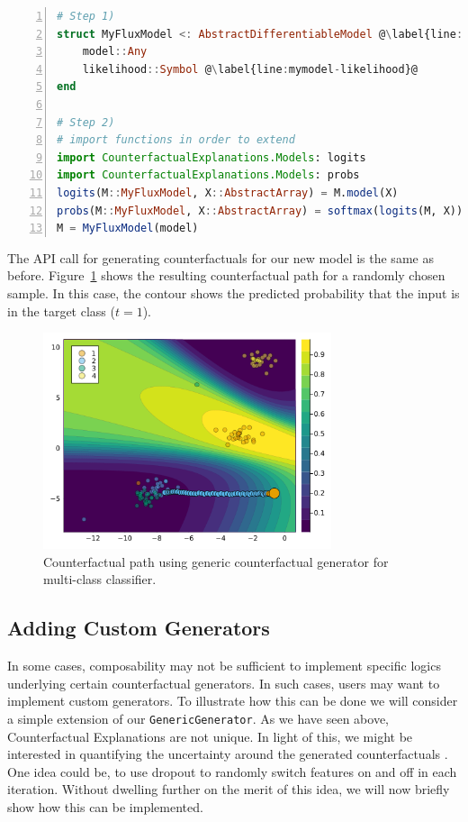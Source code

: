 \documentclass[
  letterpaper,
  DIV=11,
  numbers=noendperiod]{scrartcl}
\begin{document}
\begin{lstlisting}[language=Julia, escapechar=@, numbers=left, label={lst:mymodel}, caption={A wrapper for Flux models.}]
# Step 1)
struct MyFluxModel <: AbstractDifferentiableModel @\label{line:mymodel-subtype}@
    model::Any
    likelihood::Symbol @\label{line:mymodel-likelihood}@
end

# Step 2)
# import functions in order to extend
import CounterfactualExplanations.Models: logits
import CounterfactualExplanations.Models: probs 
logits(M::MyFluxModel, X::AbstractArray) = M.model(X)
probs(M::MyFluxModel, X::AbstractArray) = softmax(logits(M, X))
M = MyFluxModel(model)
\end{lstlisting}

The API call for generating counterfactuals for our new model is the
same as before. Figure~\ref{fig-multi} shows the resulting
counterfactual path for a randomly chosen sample. In this case, the
contour shows the predicted probability that the input is in the target
class (\(t=1\)).

\begin{figure}

{\centering \includegraphics[width=3.33333in,height=2.5in]{www/ce_multi.png}

}

\caption{\label{fig-multi}Counterfactual path using generic
counterfactual generator for multi-class classifier.}

\end{figure}

\hypertarget{sec-custom-gen}{%
\subsection{Adding Custom Generators}\label{sec-custom-gen}}

In some cases, composability may not be sufficient to implement specific
logics underlying certain counterfactual generators. In such cases,
users may want to implement custom generators. To illustrate how this
can be done we will consider a simple extension of our
\texttt{GenericGenerator}. As we have seen above, Counterfactual
Explanations are not unique. In light of this, we might be interested in
quantifying the uncertainty around the generated counterfactuals
\cite{delaney2021uncertainty}. One idea could be, to use dropout to
randomly switch features on and off in each iteration. Without dwelling
further on the merit of this idea, we will now briefly show how this can
be implemented.
\end{document}
